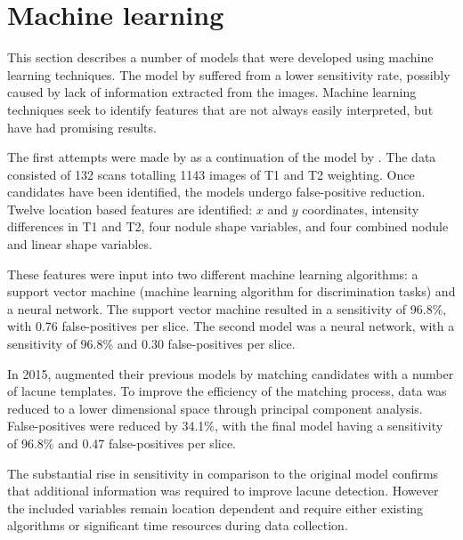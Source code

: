 \section{Machine learning}\label{litrev-ml}

This section describes a number of models that were developed using machine learning techniques. The model by \cite{Yokoyama2007} suffered from a lower sensitivity rate, possibly caused by lack of information extracted from the images. Machine learning techniques seek to identify features that are not always easily interpreted, but have had promising results. 

The first attempts were made by \cite{Uchiyama20071554, Uchiyama2007b} as a continuation of the model by \cite{Yokoyama2007}. The data consisted of 132 scans totalling 1143 images of T1 and T2 weighting. Once candidates have been identified, the models undergo false-positive reduction. Twelve location based features are identified: $x$ and $y$ coordinates, intensity differences in T1 and T2, four nodule shape variables, and four combined nodule and linear shape variables.

These features were input into two different machine learning algorithms: a support vector machine (machine learning algorithm for discrimination tasks) and a neural network. The support vector machine resulted in a sensitivity of 96.8\%, with 0.76 false-positives per slice. The second model was a neural network, with a sensitivity of 96.8\% and 0.30 false-positives per slice.

In 2015, \cite{Uchiyama2015} augmented their previous models by matching candidates with a number of lacune templates. To improve the efficiency of the matching process, data was reduced to a lower dimensional space through principal component analysis. False-positives were reduced by 34.1\%, with the final model having a sensitivity of 96.8\% and 0.47 false-positives per slice.

The substantial rise in sensitivity in comparison to the original model \citep{Yokoyama2007} confirms that additional information was required to improve lacune detection. However the included variables remain location dependent and require either existing algorithms or significant time resources during data collection.


